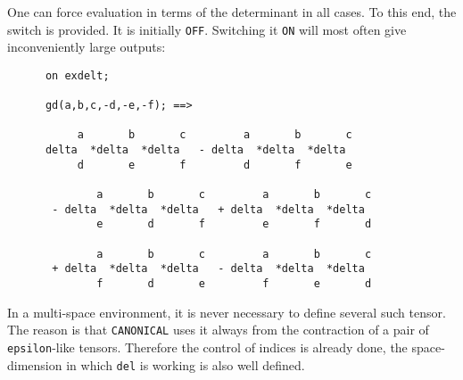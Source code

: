 One can force evaluation in terms of the determinant in all cases. 
To this end, the switch  is provided. It is initially 
\texttt{OFF}. Switching it \texttt{ON} will most often give inconveniently large outputs:
\begin{verbatim}
      on exdelt;

      gd(a,b,c,-d,-e,-f); ==>

           a       b       c         a       b       c
      delta  *delta  *delta   - delta  *delta  *delta
           d       e       f         d       f       e

              a       b       c         a       b       c
       - delta  *delta  *delta   + delta  *delta  *delta
              e       d       f         e       f       d

              a       b       c         a       b       c
       + delta  *delta  *delta   - delta  *delta  *delta
              f       d       e         f       e       d
\end{verbatim}
In a multi-space environment, it is never necessary to define several 
such tensor. The reason is that \texttt{CANONICAL} uses it 
always from the contraction of a pair of \texttt{epsilon}-like tensors.
Therefore the  control of indices is already done, the space-dimension 
in which \texttt{del} is working  is also well defined. 

